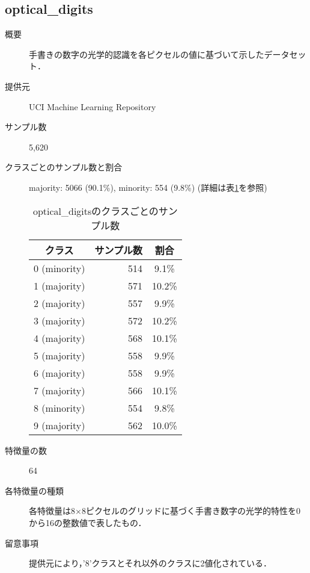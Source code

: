 \subsection{optical\_digits}
    \begin{description}
    \item[概要] 手書きの数字の光学的認識を各ピクセルの値に基づいて示したデータセット．\cite{opticaldigits}
    \item[提供元] UCI Machine Learning Repository
    \item[サンプル数] 5,620
    \item[クラスごとのサンプル数と割合] majority: 5066 (90.1\%), minority: 554 (9.8\%) (詳細は表\ref{tab:opticaldigits}を参照)
        \begin{table}
            \centering
            \caption{optical\_digitsのクラスごとのサンプル数}
            \label{tab:opticaldigits}
            \begin{tabular}{lrc} \hline
                \multicolumn{1}{c}{クラス}&
                \multicolumn{1}{c}{サンプル数}&
                \multicolumn{1}{c}{割合}\\
                \hline
                \hline
                0 (minority)& 514 & 9.1\% \\
                1 (majority)& 571 & 10.2\% \\
                2 (majority)& 557 & 9.9\% \\
                3 (majority)& 572 & 10.2\% \\
                4 (majority)& 568 & 10.1\% \\
                5 (majority)& 558 & 9.9\% \\
                6 (majority)& 558 & 9.9\% \\
                7 (majority)& 566 & 10.1\% \\
                8 (minority)& 554 & 9.8\% \\
                9 (majority)& 562 & 10.0\% \\
                \hline
            \end{tabular}
        \end{table}
    \item[特徴量の数] 64
    \item[各特徴量の種類] \mbox{}
        各特徴量は8$\times$8ピクセルのグリッドに基づく手書き数字の光学的特性を0から16の整数値で表したもの．
    \item[留意事項] 提供元により，'8'クラスとそれ以外のクラスに2値化されている．
    \end{description}

